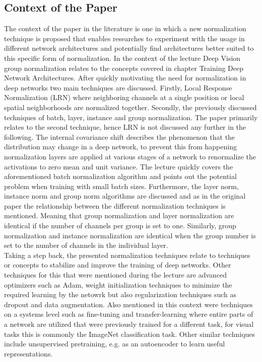 \subsection{Context of the Paper}
The context of the paper in the literature is one in which a new normalization technique is proposed that enables researches to experiment with the usage in different network architectures and potentially find architectures better suited to this specific form of normalization.
In the context of the lecture Deep Vision group normalization relates to the concepts covered in chapter  Training Deep Network Architectures.
After quickly motivating the need for normalization in deep networks two main techniques are discussed.
Firstly, Local Response Normalization (LRN) where neighboring channels at a single position or local spatial neighborhoods are normalized together.
Secondly, the previously discussed techniques of batch, layer, instance and group normalization.
The paper primarily relates to the second technique, hence LRN is not discussed any further in the following.
The internal covariance shift describes the phenomenon that the distribution may change in a deep network, to prevent this from happening normalization layers are applied at various stages of a network to renormalize the activations to zero mean and unit variance.
The lecture quickly covers the aforementioned batch normalization algorithm and points out the potential problem when training with small batch sizes.
Furthermore, the layer norm, instance norm and group norm algorithms are discussed and as in the original paper the relationship between the different normalization techniques is mentioned.
Meaning that group normalization and layer normalization are identical if the number of channels per group is set to one.
Similarly, group normalization and instance normalization are identical when the group number is set to the number of channels in the individual layer.\\

Taking a step back, the presented normalization techniques relate to techniques or concepts to stabilize and improve the training of deep networks.
Other techniques for this that were mentioned during the lecture are advanced optimizers such as Adam, weight initialization techniques to minimize the required learning by the netowrk
but also regularization techniques such as dropout and data augmentation.
Also mentioned in this context were techniques on a systems level such as fine-tuning and transfer-learning where entire parts of a network are utilized that were previously trained for a different task, for visual tasks this is commonly the ImageNet classification task.
Other similar techniques include unsupervised pretraining, e.g. as an autoencoder to learn useful representations.


